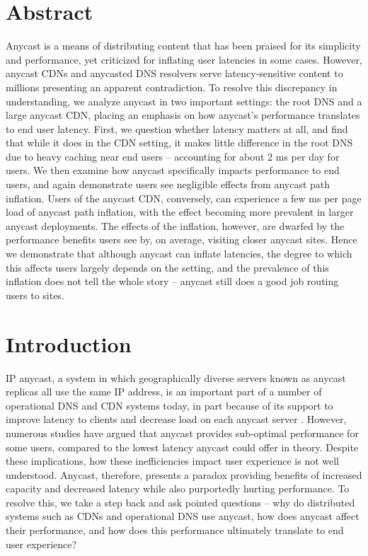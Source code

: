 \documentclass[sigconf,nonacm,10pt]{acmart}
\begin{document}
\section*{Abstract}\label{abstract-1}

Anycast is a means of distributing content that has been praised for its
simplicity and performance, yet criticized for inflating user latencies
in some cases. However, anycast CDNs and anycasted DNS resolvers serve
latency-sensitive content to millions presenting an apparent
contradiction. To resolve this discrepancy in understanding, we analyze
anycast in two important settings: the root DNS and a large anycast CDN,
placing an emphasis on how anycast's performance translates to end user
latency. \break
First, we question whether latency matters at all, and find that while
it does in the CDN setting, it makes little difference in the root DNS
due to heavy caching near end users -- accounting for about 2 ms per day
for users. We then examine how anycast specifically impacts performance
to end users, and again demonstrate users see negligible effects from
anycast path inflation. Users of the anycast CDN, conversely, can
experience a few ms per page load of anycast path inflation, with the
effect becoming more prevalent in larger anycast deployments. The
effects of the inflation, however, are dwarfed by the performance
benefits users see by, on average, visiting closer anycast sites. Hence
we demonstrate that although anycast can inflate latencies, the degree
to which this affects users largely depends on the setting, and the
prevalence of this inflation does not tell the whole story -- anycast
still does a good job routing users to sites.

\section{Introduction}\label{introduction-1}

\label{sec:introduction} IP anycast, a system in which geographically
diverse servers known as anycast replicas all use the same IP address,
is an important part of a number of operational DNS
\cite{root_servers, cloudflare_anycast, akamai_anycast, route53_anycast, google_public_dns}
and CDN \cite{calder2015analyzing,edgecast_anycast,amazon_cloudfront}
systems today, in part because of its support to improve latency to
clients and decrease load on each anycast server
\cite{katabi2000framework,metz2002ip,rfc_1546}. However, numerous
studies have argued that anycast provides sub-optimal performance for
some users, compared to the lowest latency anycast could offer in
theory. Despite these implications, how these inefficiencies impact user
experience is not well understood. Anycast, therefore, presents a
paradox providing benefits of increased capacity and decreased latency
while also purportedly hurting performance. To resolve this, we take a
step back and ask pointed questions -- why do distributed systems such
as CDNs and operational DNS use anycast, how does anycast affect their
performance, and how does this performance ultimately translate to end
user experience? \break \break
\end{document}
